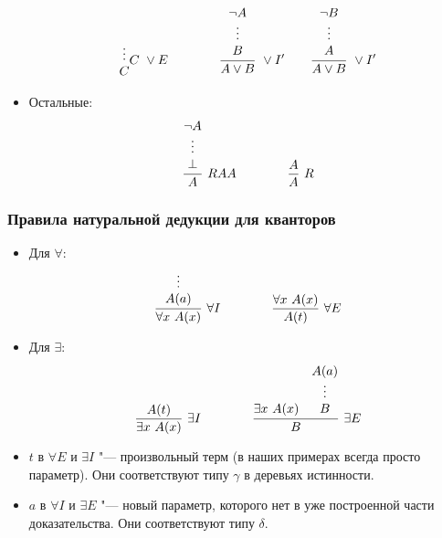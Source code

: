 \documentclass[10pt]{beamer}
\begin{document}
\begin{frame}
\begin{itemize}
\[{\begin{matrix}
            \rvdots \\
            C
        \end{matrix}
        }{C}\ \lor E
        \qquad \qquad         
        \frac{\begin{matrix}
            \neg A \\
            \rvdots \\
            B
\end{matrix}}{A \lor B}\ \lor I'
        \qquad 
\frac{\begin{matrix}
        \neg B \\
        \rvdots \\
        A
\end{matrix}}{A \lor B}\ \lor I'
        \]
        \item Остальные:
        \[
        \frac{\begin{matrix}
                \neg A \\
                \rvdots \\
                \bot
        \end{matrix}}{A}\ RAA
        \qquad \qquad 
        \frac{A}{A}\ R
        \]
    \end{itemize}
\end{frame}

\begin{frame}
    \frametitle{Правила натуральной дедукции для кванторов}
    \begin{itemize}
        \item Для $\forall$:
        \[ 
        \frac{\begin{matrix}
                \rvdots \\
                A(a)
        \end{matrix}}{\forall x ~ A(x)}\ \forall I 
        \qquad \qquad 
        \frac{\forall x ~ A(x)}{A(t)}\ \forall E
        \]
        \item Для $\exists$:
        \[
        \frac{A(t)}{\exists x ~ A(x)}\ \exists I
        \qquad \qquad 
        \frac{
            \begin{matrix}
                \phantom{A} \\
                \phantom{\rvdots} \\
                \exists x ~ A(x)
            \end{matrix}
            \quad
            \begin{matrix}
                A(a) \\
                \rvdots \\
                B
            \end{matrix}
        }{B}\ \exists E
        \]
        \item $t$ в $\forall E$ и $\exists I$ "--- произвольный терм (в наших примерах всегда просто параметр). Они соответствуют типу $\gamma$ в деревьях истинности.
        \item $a$ в $\forall I$ и $\exists E$ "--- новый параметр, которого нет в уже построенной части доказательства. Они соответствуют типу $\delta$.
    \end{itemize}
\end{frame}
\end{document}
